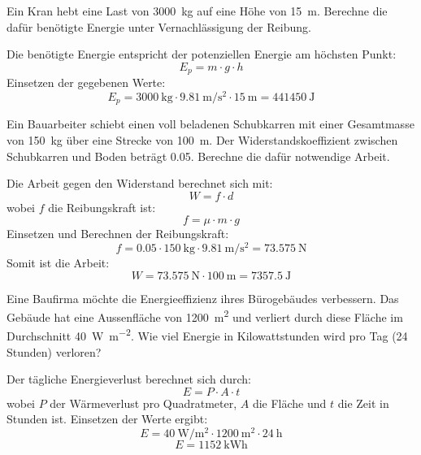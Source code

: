 \begin{questions}
\question
Ein Kran hebt eine Last von \SI{3000}{\kilo\gram} auf eine Höhe von \SI{15}{\meter}. Berechne die dafür benötigte Energie unter Vernachlässigung der Reibung.

\begin{solution}
Die benötigte Energie entspricht der potenziellen Energie am höchsten Punkt:
\[ E_p = m \cdot g \cdot h \]
Einsetzen der gegebenen Werte:
\[ E_p = \SI{3000}{\kilo\gram} \cdot \SI{9.81}{\meter\per\second\squared} \cdot \SI{15}{\meter} = \SI{441450}{\joule} \]
\end{solution}

\question
Ein Bauarbeiter schiebt einen voll beladenen Schubkarren mit einer Gesamtmasse von \SI{150}{\kilo\gram} über eine Strecke von \SI{100}{\meter}. Der Widerstandskoeffizient zwischen Schubkarren und Boden beträgt 0.05. Berechne die dafür notwendige Arbeit.

\begin{solution}
Die Arbeit gegen den Widerstand berechnet sich mit:
\[ W = f \cdot d \]
wobei \( f \) die Reibungskraft ist:
\[ f = \mu \cdot m \cdot g \]
Einsetzen und Berechnen der Reibungskraft:
\[ f = 0.05 \cdot \SI{150}{\kilo\gram} \cdot \SI{9.81}{\meter\per\second\squared} = \SI{73.575}{\newton} \]
Somit ist die Arbeit:
\[ W = \SI{73.575}{\newton} \cdot \SI{100}{\meter} = \SI{7357.5}{\joule} \]
\end{solution}

\question
Eine Baufirma möchte die Energieeffizienz ihres Bürogebäudes verbessern. Das Gebäude hat eine Aussenfläche von \SI{1200}{\meter\squared} und verliert durch diese Fläche im Durchschnitt \SI{40}{\watt\per\meter\squared}. Wie viel Energie in Kilowattstunden wird pro Tag (24 Stunden) verloren?

\begin{solution}
Der tägliche Energieverlust berechnet sich durch:
\[ E = P \cdot A \cdot t \]
wobei \( P \) der Wärmeverlust pro Quadratmeter, \( A \) die Fläche und \( t \) die Zeit in Stunden ist.
Einsetzen der Werte ergibt:
\[ E = \SI{40}{\watt\per\meter\squared} \cdot \SI{1200}{\meter\squared} \cdot \SI{24}{\hour} \]
\[ E = \SI{1152}{\kilo\watt\hour} \]
\end{solution}



\end{questions}



